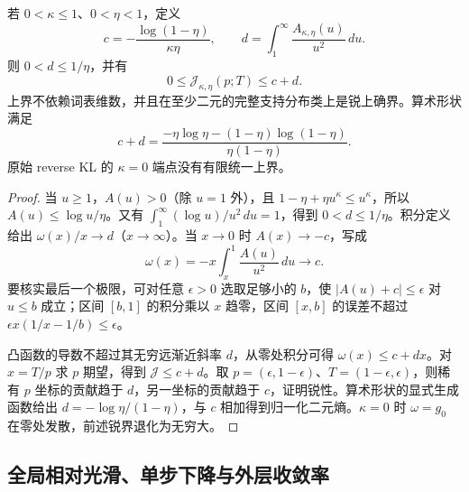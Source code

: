 \documentclass[lang=cn,scheme=chinese,openany]{../book/elegantbook}
\begin{document}
\begin{theorem}[精确 MD 目标的锐统一上界]
\label{thm:power-md-uniform-cap}
若 $0<\kappa\le1$、$0<\eta<1$，定义
\begin{equation}
 c=-\frac{\log(1-\eta)}{\kappa\eta},\qquad
 d=\int_1^\infty\frac{A_{\kappa,\eta}(u)}{u^2}\,du.
\end{equation}
则 $0<d\le1/\eta$，并有
\begin{equation}
 0\le\mathcal J_{\kappa,\eta}(p;T)\le c+d.
 \label{eq:power-md-uniform-cap}
\end{equation}
上界不依赖词表维数，并且在至少二元的完整支持分布类上是锐上确界。算术形状满足
\begin{equation}
 c+d=\frac{-\eta\log\eta-(1-\eta)\log(1-\eta)}{\eta(1-\eta)}.
\end{equation}
原始 reverse KL 的 $\kappa=0$ 端点没有有限统一上界。
\end{theorem}

\begin{proof}
当 $u\ge1$，$A(u)>0$（除 $u=1$ 外），且 $1-\eta+\eta u^\kappa\le u^\kappa$，所以 $A(u)\le\log u/\eta$。又有 $\int_1^\infty(\log u)/u^2\,du=1$，得到 $0<d\le1/\eta$。积分定义给出 $\omega(x)/x\to d$（$x\to\infty$）。当 $x\to0$ 时 $A(x)\to-c$，写成
\begin{equation}
 \omega(x)=-x\int_x^1\frac{A(u)}{u^2}\,du\longrightarrow c.
\end{equation}
要核实最后一个极限，可对任意 $\epsilon>0$ 选取足够小的 $b$，使 $|A(u)+c|\le\epsilon$ 对 $u\le b$ 成立；区间 $[b,1]$ 的积分乘以 $x$ 趋零，区间 $[x,b]$ 的误差不超过 $\epsilon x(1/x-1/b)\le\epsilon$。

凸函数的导数不超过其无穷远渐近斜率 $d$，从零处积分可得 $\omega(x)\le c+dx$。对 $x=T/p$ 求 $p$ 期望，得到 $\mathcal J\le c+d$。取 $p=(\epsilon,1-\epsilon)$、$T=(1-\epsilon,\epsilon)$，则稀有 $p$ 坐标的贡献趋于 $d$，另一坐标的贡献趋于 $c$，证明锐性。算术形状的显式生成函数给出 $d=-\log\eta/(1-\eta)$，与 $c$ 相加得到归一化二元熵。$\kappa=0$ 时 $\omega=g_0$ 在零处发散，前述锐界退化为无穷大。
\end{proof}
\subsection{全局相对光滑、单步下降与外层收敛率}
\end{document}
